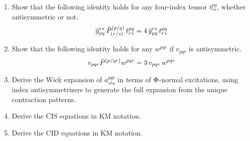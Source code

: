 \documentclass[11pt]{article}
\numberwithin{equation}{section}
\begin{document}
\begin{enumerate}
\item
  Show that the following identity holds for any four-index tensor $t^{pq}_{rs}$, whether antisymmetric or not.
  \begin{align*}
    \overline{g}_{pq}^{rs}\,
    \hat{P}^{(p/q)}_{(r/s)}\,
    t^{pq}_{rs}
  =
    4\,
    \overline{g}_{pq}^{rs}\,
    t^{pq}_{rs}
  \end{align*}

\item
  Show that the following identity holds for any $w^{pqr}$ if $v_{pqr}$ is antisymmetric.
  \begin{align*}
    v_{pqr}
    \hat{P}^{(p/qr)}
    w^{pqr}
  =
    3\,
    v_{pqr}\,
    w^{pqr}
  \end{align*}

\item
  Derive the Wick expansion of $a^{pqr}_{stu}$ in terms of $\Phi $-normal excitations, using index antisymmetrizers to generate the full expansion from the unique contraction patterns.

\item
  Derive the CIS equations in KM notation.

\item
  Derive the CID equations in KM notation.
\end{enumerate}
\end{document}
